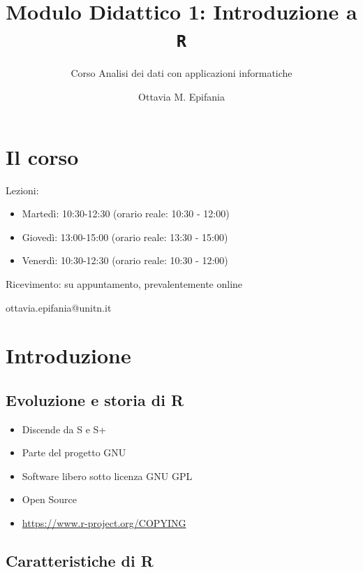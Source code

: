 \documentclass[
  ignorenonframetext,
  compress, aspectratio=149]{beamer}
\title{Modulo Didattico 1: Introduzione a \texttt{R}}
\subtitle{Corso Analisi dei dati con applicazioni informatiche}
\author{Ottavia M. Epifania}
\date{}
\providecommand{\tightlist}{%
  \setlength{\itemsep}{0pt}\setlength{\parskip}{0pt}}
\begin{document}
\frame{\titlepage}


\section{Il corso}\label{il-corso}

\begin{frame}{}
\label{section}
Lezioni:

\begin{itemize}
\tightlist
\item
  Martedì: 10:30-12:30 (orario reale: 10:30 - 12:00)
\item
  Giovedì: 13:00-15:00 (orario reale: 13:30 - 15:00)
\item
  Venerdì: 10:30-12:30 (orario reale: 10:30 - 12:00)
\end{itemize}

Ricevimento: su appuntamento, prevalentemente online

\begin{center}
ottavia.epifania@unitn.it
\end{center}
\end{frame}

\section{Introduzione}\label{introduzione}

\subsection{Evoluzione e storia di R}\label{evoluzione-e-storia-di-r}

\begin{frame}{}
\label{section-1}
\begin{itemize}
\tightlist
\item
  Discende da S e S+
\item
  Parte del progetto GNU
\item
  Software libero sotto licenza GNU GPL
\item
  Open Source
\item
  \url{https://www.r-project.org/COPYING}
\end{itemize}
\end{frame}

\subsection{Caratteristiche di R}\label{caratteristiche-di-r}
\end{document}
